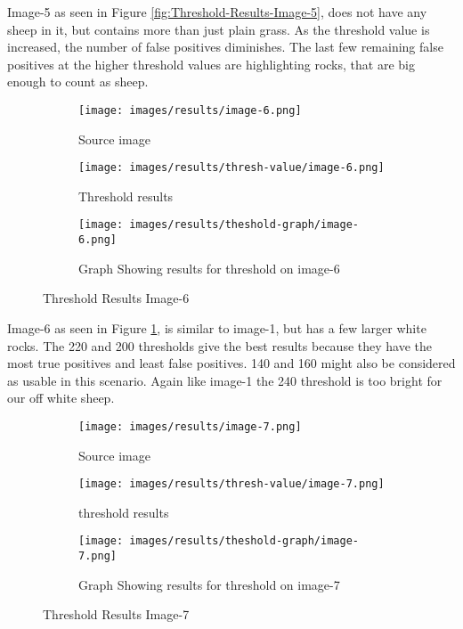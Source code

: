
Image-5 as seen in Figure \ref{fig:Threshold-Results-Image-5}, does not have any sheep in it, but contains more than just plain grass. As the threshold value is increased, the number of false positives diminishes. The last few remaining false positives at the higher threshold values are highlighting rocks, that are big enough to count as sheep.

\begin{figure}[H]
    \centering

\begin{subfigure}{.5\textwidth}
    \centering
    \texttt{[image: images/results/image-6.png]}
    \caption{Source image}

\end{subfigure}%
\begin{subfigure}{.5\textwidth}
\centering
    \texttt{[image: images/results/thresh-value/image-6.png]}
    \caption{Threshold results}

\end{subfigure}
\begin{subfigure}{.9\textwidth}
\centering
    \texttt{[image: images/results/theshold-graph/image-6.png]}
    \caption{Graph Showing results for threshold on image-6}
\end{subfigure}%

    \caption{Threshold Results Image-6}
    \label{fig:Threshold-Results-Image-6}
\end{figure}

Image-6 as seen in Figure \ref{fig:Threshold-Results-Image-6}, is similar to image-1, but has a few larger white rocks. The 220 and 200 thresholds give the best results because they have the most true positives and least false positives. 140 and 160 might also be considered as usable in this scenario. Again like image-1 the 240 threshold is too bright for our off white sheep.

\begin{figure}[H]
    \centering

\begin{subfigure}{.5\textwidth}
    \centering
    \texttt{[image: images/results/image-7.png]}
    \caption{Source image}

\end{subfigure}%
\begin{subfigure}{.5\textwidth}
\centering
    \texttt{[image: images/results/thresh-value/image-7.png]}
    \caption{threshold results}

\end{subfigure}
\begin{subfigure}{.9\textwidth}
\centering
    \texttt{[image: images/results/theshold-graph/image-7.png]}
    \caption{Graph Showing results for threshold on image-7}
\end{subfigure}%

    \caption{Threshold Results Image-7}
    \label{fig:Threshold-Results-Image-7}
\end{figure}

